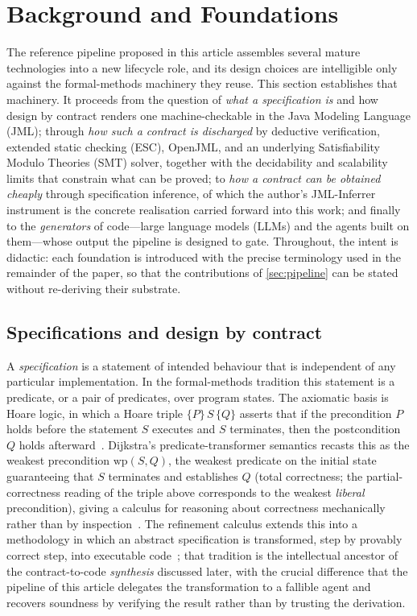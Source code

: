 \section{Background and Foundations}\label{sec:background}

The reference pipeline proposed in this article assembles several mature technologies into a new lifecycle role, and its design choices are intelligible only against the formal-methods machinery they reuse. This section establishes that machinery. It proceeds from the question of \emph{what a specification is} and how design by contract renders one machine-checkable in the Java Modeling Language (JML); through \emph{how such a contract is discharged} by deductive verification, extended static checking (ESC), OpenJML, and an underlying Satisfiability Modulo Theories (SMT) solver, together with the decidability and scalability limits that constrain what can be proved; to \emph{how a contract can be obtained cheaply} through specification inference, of which the author's JML-Inferrer instrument is the concrete realisation carried forward into this work; and finally to the \emph{generators} of code---large language models (LLMs) and the agents built on them---whose output the pipeline is designed to gate. Throughout, the intent is didactic: each foundation is introduced with the precise terminology used in the remainder of the paper, so that the contributions of \cref{sec:pipeline} can be stated without re-deriving their substrate.

\subsection{Specifications and design by contract}\label{subsec:bg-dbc}

A \emph{specification} is a statement of intended behaviour that is independent of any particular implementation. In the formal-methods tradition this statement is a predicate, or a pair of predicates, over program states. The axiomatic basis is Hoare logic, in which a Hoare triple $\{P\}\,S\,\{Q\}$ asserts that if the precondition $P$ holds before the statement $S$ executes and $S$ terminates, then the postcondition $Q$ holds afterward~\cite{hoare1969axiomatic}. Dijkstra's predicate-transformer semantics recasts this as the weakest precondition $\mathrm{wp}(S, Q)$, the weakest predicate on the initial state guaranteeing that $S$ terminates and establishes $Q$ (total correctness; the partial-correctness reading of the triple above corresponds to the weakest \emph{liberal} precondition), giving a calculus for reasoning about correctness mechanically rather than by inspection~\cite{dijkstra1976discipline,dijkstra1975guarded}. The refinement calculus extends this into a methodology in which an abstract specification is transformed, step by provably correct step, into executable code~\cite{back1998refinement,morgan1994programming}; that tradition is the intellectual ancestor of the contract-to-code \emph{synthesis} discussed later, with the crucial difference that the pipeline of this article delegates the transformation to a fallible agent and recovers soundness by verifying the result rather than by trusting the derivation.


